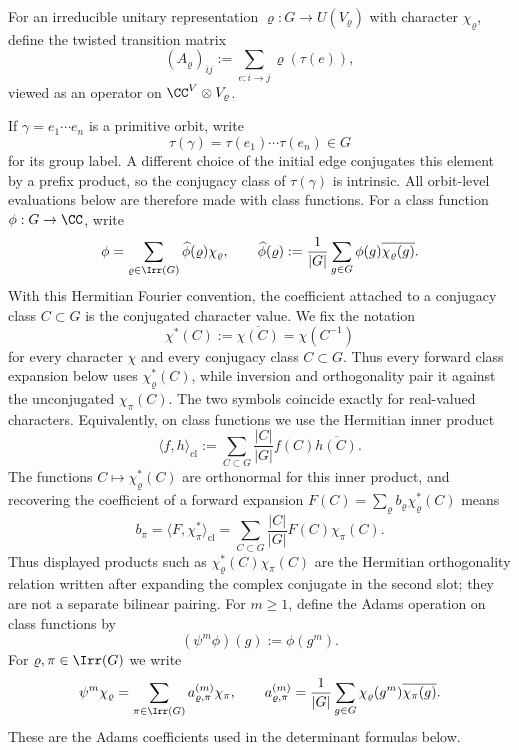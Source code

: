 For an irreducible unitary representation
\(\varrho:G\to U(V_\varrho)\) with character \(\chi_\varrho\), define
the twisted transition matrix
\begin{equation}\label{eq:twisted-matrix-def}
  (A_\varrho)_{ij}:=\sum_{e:i\to j}\varrho(\tau(e)),
\end{equation}
viewed as an operator on \(\CC^V\otimes V_\varrho\).

If \(\gamma=e_1\cdots e_n\) is a primitive orbit, write
\[
  \tau(\gamma)=\tau(e_1)\cdots\tau(e_n)\in G
\]
for its group label. A different choice of the initial edge conjugates
this element by a prefix product, so the conjugacy class of
\(\tau(\gamma)\) is intrinsic. All orbit-level evaluations below are
therefore made with class functions. For a class function
\(\phi:G\to\CC\), write
\begin{equation}\label{eq:class-function-fourier}
  \phi
  =\sum_{\varrho\in\Irr(G)}\widehat\phi(\varrho)\chi_\varrho,
  \qquad
  \widehat\phi(\varrho)
  :=\frac{1}{|G|}\sum_{g\in G}\phi(g)\overline{\chi_\varrho(g)}.
\end{equation}
With this Hermitian Fourier convention, the coefficient attached to a
conjugacy class \(C\subset G\) is the conjugated character value. We
fix the notation
\[
  \chi^\ast(C)
  :=\overline{\chi(C)}
  =\chi(C^{-1})
\]
for every character \(\chi\) and every conjugacy class \(C\subset G\).
Thus every forward class expansion below uses \(\chi_\varrho^\ast(C)\),
while inversion and orthogonality pair it against the unconjugated
\(\chi_\pi(C)\). The two symbols coincide exactly for real-valued
characters.
Equivalently, on class functions we use the Hermitian inner product
\[
  \langle f,h\rangle_{\mathrm{cl}}
  :=
  \sum_{C\subset G}\frac{|C|}{|G|}f(C)\overline{h(C)}.
\]
The functions \(C\mapsto\chi_\varrho^\ast(C)\) are orthonormal for this
inner product, and recovering the coefficient of a forward expansion
\(F(C)=\sum_\varrho b_\varrho\chi_\varrho^\ast(C)\) means
\[
  b_\pi
  =
  \langle F,\chi_\pi^\ast\rangle_{\mathrm{cl}}
  =
  \sum_{C\subset G}\frac{|C|}{|G|}F(C)\chi_\pi(C).
\]
Thus displayed products such as
\(\chi_\varrho^\ast(C)\chi_\pi(C)\) are the Hermitian orthogonality
relation written after expanding the complex conjugate in the second
slot; they are not a separate bilinear pairing.
For \(m\ge 1\), define the Adams operation on class functions by
\begin{equation}\label{eq:adams-class-function}
  (\psi^m\phi)(g):=\phi(g^m).
\end{equation}
For \(\varrho,\pi\in\Irr(G)\) we write
\begin{equation}\label{eq:prelim-adams-character-coefficients}
  \psi^m\chi_\varrho
  =\sum_{\pi\in\Irr(G)}a_{\varrho,\pi}^{(m)}\chi_\pi,
  \qquad
  a_{\varrho,\pi}^{(m)}
  =\frac{1}{|G|}\sum_{g\in G}
    \chi_\varrho(g^m)\overline{\chi_\pi(g)} .
\end{equation}
These are the Adams coefficients used in the determinant formulas below.

